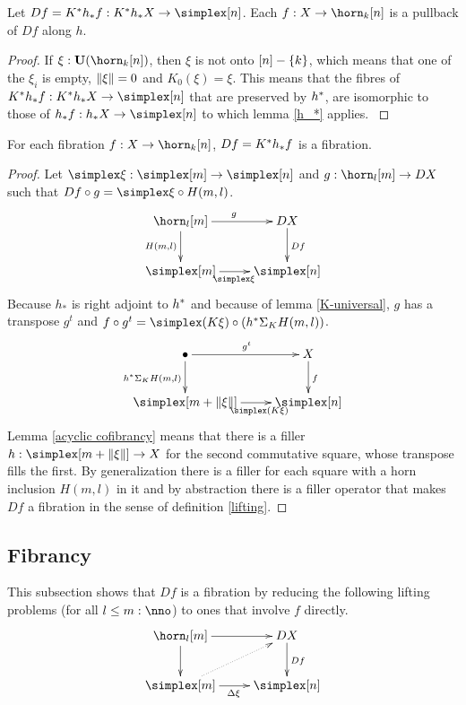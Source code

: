 \documentclass[csh.tex]{subfiles}
\begin{document}


\begin{lemma} Let $Df = K\ri h_* f\of K\ri h_*X\to\simplex[n]$. Each $f\of X\to\horn_k[n]$ is a pullback of $Df$ along $h$. \label{f is pullback}\end{lemma}

\begin{proof}
If $\xi\of\base(\horn_k[n])$, then $\xi$ is not onto $[n]-\left\{k\right\}$, which means that one of the $\xi_i$ is empty, $\Vert \xi \Vert = 0$ and $K_0(\xi)=\xi$.
This means that the fibres of $K\ri h_* f\of K\ri h_*X\to\simplex[n]$ that are preserved by $h^*$, are isomorphic to those of $h_* f\of h_*X\to\simplex[n]$ to which lemma \ref{h_*} applies.
\label{descent pullback}
\end{proof}

\begin{lemma} For each fibration $f\of X\to\horn_k[n]$, $Df=K^* h_*f$ is a fibration. \label{descent2} \end{lemma}


\begin{proof} Let $\simplex\xi\of \simplex[m]\to\simplex[n]$ and $g\of \horn_l[m]\to DX$ such that $Df\circ g = \simplex\xi\circ H(m,l)$. 
\[
	\xymatrix{
		\horn_l[m]\ar[r]^g\ar[d]_{H(m,l)} & DX\ar[d]^{Df} \\
		\simplex[m]\ar[r]_{\simplex\xi} & \simplex[n]
	}	
\]
Because $h_*$ is right adjoint to $h^*$ and because of lemma \ref{K-universal}, $g$ has a transpose $g^t$ and $f\circ g^t = \simplex(K\xi)\circ (h\ri \depsum{K} H(m,l))$.
\[
	\xymatrix{
		\bullet\ar[r]^{g^t}\ar[d]_{h\ri \depsum K H(m,l)} & X\ar[d]^{f} \\
		\simplex[m+\norm\xi]\ar[r]_(.6){\simplex(K\xi)} & \simplex[n]
	}	
\]
Lemma \ref{acyclic cofibrancy} means that there is a filler $h\of \simplex[m+\norm\xi]\to X$ for the second commutative square, whose transpose fills the first.
By generalization there is a filler for each square with a horn inclusion $H(m,l)$ in it and by abstraction there is a filler operator that makes $Df$ a fibration in the sense of definition \ref{lifting}.
\end{proof}


\subsection{Fibrancy}
This subsection shows that $Df$ is a fibration by reducing the following lifting problems (for all $l\leq m\of\nno$) to ones that involve $f$ directly.
\begin{equation}
	\xymatrix{
		\horn_l[m]\ar[r]\ar[d] & DX\ar[d]^{Df} \\
		\simplex[m]\ar[r]_{\Delta\xi} \ar@{.>}[ur] & \simplex[n]
	}
	\label{descent lifting problem}
\end{equation}
\end{document}
